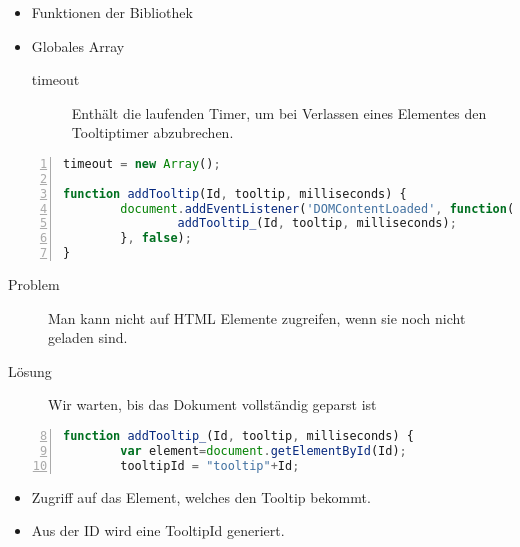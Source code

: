 \begin{frame}[<+->]
\begin{itemize}
\item Funktionen der Bibliothek
\normalsize
\item Globales Array
\small
\begin{description}
\item[timeout]Enthält die laufenden Timer, um bei Verlassen eines Elementes den Tooltiptimer abzubrechen.
\end{description}
\end{itemize}
\end{frame}
\begin{frame}[<+->][fragile]
\tiny{\begin{lstlisting}[language=JavaScript, 
		   numbers=left,
		   numbersep=3pt,
		   breaklines=true]		 
timeout = new Array();

function addTooltip(Id, tooltip, milliseconds) {
        document.addEventListener('DOMContentLoaded', function(e){
                addTooltip_(Id, tooltip, milliseconds);
        }, false);
}
\end{lstlisting}}
\normalsize
\begin{description}
\item[Problem]Man kann nicht auf HTML Elemente zugreifen, wenn sie noch nicht geladen sind.
\item[Lösung]Wir warten, bis das Dokument vollständig geparst ist
\end{description}
\end{frame}
\begin{frame}[<+->][fragile]
\tiny{\begin{lstlisting}[language=JavaScript, 
		   numbers=left,
		   numbersep=3pt,
		   breaklines=true,
		   firstnumber=8]
function addTooltip_(Id, tooltip, milliseconds) {
        var element=document.getElementById(Id);
        tooltipId = "tooltip"+Id;
\end{lstlisting}}
\normalsize
\pause
\begin{itemize}
\item Zugriff auf das Element, welches den Tooltip bekommt.
\item Aus der ID wird eine TooltipId generiert.
\end{itemize}
\end{frame}
